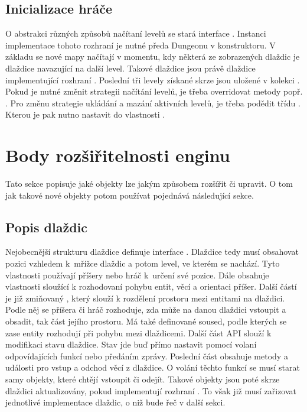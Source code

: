\subsection{Inicializace hráče}
O abstrakci různých způsobů načítaní levelů se stará interface . Instanci implementace tohoto
rozhraní je nutné předa Dungeonu v konstruktoru. V základu se nové mapy načítají v momentu, kdy některá ze zobrazených
dlaždic je dlaždice navazující na další level. Takové dlaždice jsou právě dlaždice implementující  rozhraní  .
Poslední tři levely získané skrze  jsou uložené v kolekci . Pokud je nutné změnit 
strategii načítání levelů, je třeba overridovat metody  popř. . Pro změnu 
strategie ukládání a mazání aktivních levelů, je třeba podědit třídu . Kterou je pak nutno nastavit
do vlastnosti . 

\section{Body rozšiřitelnosti enginu}
Tato sekce popisuje jaké objekty lze jakým způsobem rozšířit či upravit. O tom jak takové nové objekty potom používat
pojednává následující sekce.

\subsection{Popis dlaždic}
Nejobecnější strukturu dlaždice definuje interface . Dlaždice tedy musí obsahovat pozici vzhledem
k~mřížce dlaždic a potom level, ve kterém se nachází. Tyto vlastnosti používají příšery nebo hráč k~určení
své pozice. Dále obsahuje vlastnosti sloužící k rozhodovaní pohybu entit, věcí a orientaci příšer. Další částí
je již zmiňovaný , který slouží k rozdělení prostoru mezi entitami na dlaždici. Podle něj se 
příšera či hráč rozhoduje, zda může na danou dlaždici vstoupit a obsadit, tak část jejího prostoru. Má také definované
soused, podle kterých se zase entity rozhodují při pohybu mezi dlaždicemi. Další část API slouží k modifikaci stavu dlaždice.
Stav jde buď přímo nastavit pomocí volaní odpovídajících funkcí nebo předáním zprávy. Poslední
část obsahuje metody a události pro vstup a odchod věcí z dlaždice. O volání těchto  funkcí se musí starat samy objekty,
které chtějí vstoupit či odejít. Takové objekty jsou poté skrze dlaždici aktualizovány, pokud implementují rozhraní
. To však již musí zařizovat jednotlivé implementace dlaždic, o niž bude řeč v další sekci.

